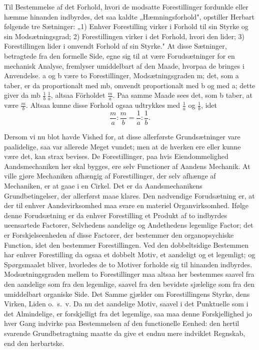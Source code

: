 \documentclass[12pt]{book}
\newcommand{\opage}[1]{\marginnote{\footnotesize\textit{[#1]}}}
\newcommand{\apage}[1]{\marginnote{\footnotesize\textit{[#1]}}}
\begin{document}
Til Bestemmelse af det Forhold, hvori de modsatte Forestillinger fordunkle eller hæmme hinanden
indbyrdes, det saa\-%
kaldte \apage{418} „Hæmningsforhold", opstiller Herbart følgende tre Sætninger: „1) Enhver Forestilling virker i
Forhold til sin Styrke og sin Modsætningsgrad; 2) Forestillingen virker i det Forhold, hvori den
lider; 3) Forestillingen lider i omvendt Forhold af sin Styrke." At disse Sætninger, betragtede fra
den formelle Side, egne sig til at være Forudsætninger for en mechanisk Analyse, fremlyser
umiddelbart af den Maade, hvorpaa de bringes i Anvendelse. a og b være to Forestillinger,
Modsætningsgraden m; det, som a taber, er da proportionalt med mb, omvendt proportionalt med b og med
a; dette giver da mb $\frac{1}{b}\,\frac{1}{a}$, altsaa Förholdet $\frac{m}{a}$. %
Paa samme Maade sees det, som b taber, at være $\frac{m}{b}$. Altsaa kunne disse Forhold ogsaa
udtrykkes med $\frac{1}{a}$ og $\frac{1}{b}$, idet
\[ \frac{m}{a} : \frac{m}{b} = \frac{1}{a} : \frac{1}{b}. \] %

Dersom vi nu blot havde Vished for, at disse allerførste Grundsætninger vare paalidelige, saa var
allerede Meget vundet; men at de hverken ere eller kunne være det, kan strax bevises. De
Forestillinger, paa hvis Eiendommelighed Aandsmechaniken her skal bygges, ere selv Functioner af
Aandens Mechanik. At ville gjøre Mechaniken afhængig af Forestillinger, der selv afhænge af
Mechaniken, er at gaae i en Cirkel. Det er da Aandsmechanikens Grundbetingelser, der allerførst maae
klares. Den nødvendige Forudsætning er, at der til enhver Aandsvirksomhed maa svare en materiel
Organvirksomhed. Ifølge denne Forudsætning er da enhver Forestilling et Produkt af to indbyrdes
ueensartede Factorer, Selvhedens aandelige og Andethedens legemlige Factor; det er Forskjelseenheden
af disse Factorer, der bestemmer den organopsychiske Function, idet den bestemmer Forestillingen. Ved
den dobbeltsidige Bestemmen har enhver Forestilling da
\opage{419} ogsaa et dobbelt Motiv, et aandeligt og et legemligt; og Spørgsmaalet bliver, hvorledes de to Motiver
forholde sig til hinanden indbyrdes. Modsætningsgraden mellem to Forestillinger maa altsaa her
bestemmes saavel fra den aandelige som fra den legemlige, saavel fra den bevidste sjælelige som fra
den umiddelbart organiske Side. Det Samme gjælder om Forestillingens Styrke, dens Virken, Liden o.\
s.\ v. Da nu det aandelige Motiv, saavel i det Punktuelle som i det Almindelige, er forskjelligt fra
det legemlige, saa maa denne Forskjellighed jo hver Gang indvirke paa Bestemmelsen af den
functionelle Eenhed: den hertil svarende Grundbetragtning maatte da give et endnu mere indviklet
Regnskab, end den herbartske.
\end{document}
